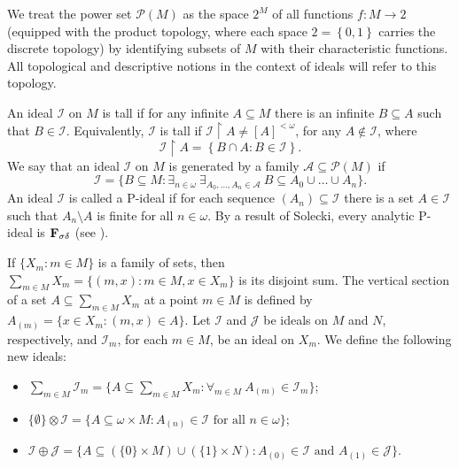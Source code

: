 \documentclass{amsart}
\newcommand{\I}{\mathcal{I}}
\newcommand{\J}{\mathcal{J}}
\begin{document}
We treat the power set $\mathcal{P}(M)$ as the space $2^M$ of all functions $f:M\rightarrow 2$ (equipped with the product topology, where each space $2=\left\{0,1\right\}$ carries the discrete topology) by identifying subsets of $M$ with their characteristic functions. All topological and descriptive notions in the context of ideals will refer to this topology. 

An ideal $\I$ on $M$ is tall if for any infinite $A\subseteq M$ there is an infinite $B\subseteq A$ such that $B\in\I$. Equivalently, $\I$ is tall if $\I\restriction A\neq[A]^{<\omega}$, for any $A\notin\I$, where
\[
\I\restriction A=\left\{B\cap A:B\in\I\right\}.
\]
We say that an ideal $\I$ on $M$ is generated by a family $\mathcal{A}\subseteq\mathcal{P}(M)$ if 
\[
\I=\{B\subseteq M:\exists_{n\in\omega}\ \exists_{A_0,\ldots,A_n\in\mathcal{A}}\ B\subseteq A_0\cup\ldots\cup A_n\}.
\]
An ideal $\I$ is called a P-ideal if for each sequence $(A_n)\subseteq  \I$ there is a set $A\in\I$ such that $A_n\setminus A$ is finite for all $n\in\omega$. By a result of Solecki, every analytic P-ideal is $\bf{F_{\sigma\delta}}$ (see \cite{Solecki}).

If $\{X_m: m\in M\}$ is a family of sets, then $\sum_{m\in M}X_m=\{(m,x): m\in M,x\in X_m\}$ is its disjoint sum. The vertical section of a set $A\subseteq \sum_{m\in M}X_m$ at a point $m\in M$ is defined
by $A_{(m)} = \{x\in X_m: (m,x)\in A\}$. Let $\I$ and $\J$ be ideals on $M$ and $N$, respectively, and $\I_m$, for each $m\in M$, be an ideal on $X_m$. We define the following new ideals:
\begin{itemize}
	\item $\sum_{m\in M}\I_m=\{A\subseteq \sum_{m\in M}X_m: \forall_{m\in M}\ A_{(m)}\in\I_m\}$;
	\item $\{\emptyset\} \otimes  \I= \{A\subseteq \omega\times M: A_{(n)} \in \I\text{ for all }n\in \omega\}$;
    \item $\I\oplus\J=\{A\subseteq(\{0\}\times M)\cup(\{1\}\times N): A_{(0)}\in\I\text{ and }A_{(1)}\in\J\}$.
\end{itemize}
\end{document}
